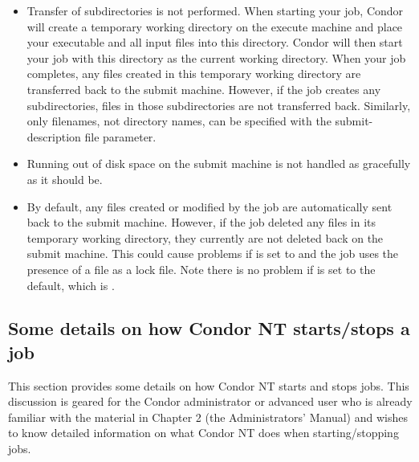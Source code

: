\begin{itemize}

\item Transfer of subdirectories is not performed.  When starting your job,
Condor will create a temporary working directory on the execute machine and
place your executable and all input files into this directory.  Condor will
then start your job with this directory as the current working directory.
When your job completes, any files created in this temporary working
directory are transferred back to the submit machine.  However, if the job
creates any subdirectories, files in those subdirectories are not
transferred back.  Similarly, only filenames, not directory names, can be
specified with the  submit-description file
parameter.

\item Running out of disk space on the submit machine is not handled as
gracefully as it should be. 

\item By default, any files created or modified by the job are automatically
sent back to the submit machine.  However, if the job deleted any files in
its temporary working directory, they currently are not deleted back on the
submit machine.  This could cause problems if 
 is set to  and the job uses the presence
of a file as a lock file.  Note there is no problem if 
is set to the default, which is .

\end{itemize}

\subsection{Some details on how Condor NT starts/stops a job}

This section provides some details on how Condor NT starts and stops jobs.
This discussion is geared for the Condor administrator or advanced user who is
already familiar with the material in Chapter 2 (the Administrators' Manual)
and wishes to know detailed information on what Condor NT does when
starting/stopping jobs.

